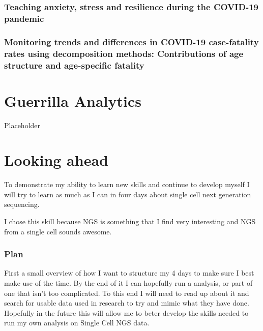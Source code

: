 \documentclass[11pt,a4paper,]{awesome-cv}
\begin{document}
\hypertarget{teaching-anxiety-stress-and-resilience-during-the-covid-19-pandemic}{%
\subsection{Teaching anxiety, stress and resilience during the COVID-19
pandemic}\label{teaching-anxiety-stress-and-resilience-during-the-covid-19-pandemic}}

\hypertarget{monitoring-trends-and-differences-in-covid-19-case-fatality-rates-using-decomposition-methods-contributions-of-age-structure-and-age-specific-fatality}{%
\subsection{Monitoring trends and differences in COVID-19 case-fatality
rates using decomposition methods: Contributions of age structure and
age-specific
fatality}\label{monitoring-trends-and-differences-in-covid-19-case-fatality-rates-using-decomposition-methods-contributions-of-age-structure-and-age-specific-fatality}}

\hypertarget{guerrilla-analytics}{%
\chapter{Guerrilla Analytics}\label{guerrilla-analytics}}

Placeholder

\hypertarget{looking-ahead}{%
\chapter{Looking ahead}\label{looking-ahead}}

To demonstrate my ability to learn new skills and continue to develop
myself I will try to learn as much as I can in four days about single
cell next generation sequencing.

I chose this skill because NGS is something that I find very interesting
and NGS from a single cell sounds awesome.

\hypertarget{plan}{%
\subsection{Plan}\label{plan}}

First a small overview of how I want to structure my 4 days to make sure
I best make use of the time. By the end of it I can hopefully run a
analysis, or part of one that isn't too complicated. To this end I will
need to read up about it and search for usable data used in research to
try and mimic what they have done. Hopefully in the future this will
allow me to beter develop the skills needed to run my own analysis on
Single Cell NGS data.
\end{document}
